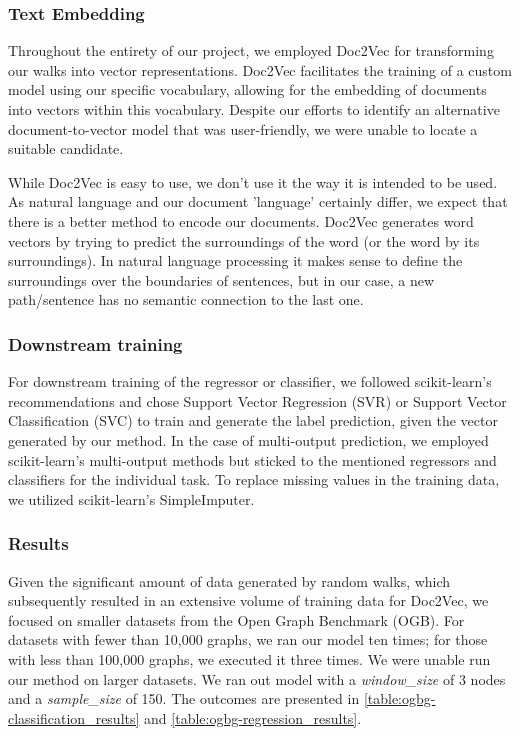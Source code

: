 \subsubsection{Text Embedding}
Throughout the entirety of our project, we employed Doc2Vec\cite{2014doc2vec} for transforming our walks into vector representations. Doc2Vec facilitates the training of a custom model using our specific vocabulary, allowing for the embedding of documents into vectors within this vocabulary. Despite our efforts to identify an alternative document-to-vector model that was user-friendly, we were unable to locate a suitable candidate.

While Doc2Vec is easy to use, we don't use it the way it is intended to be used. As natural language and our document 'language' certainly differ, we expect that there is a better method to encode our documents. Doc2Vec generates word vectors by trying to predict the surroundings of the word (or the word by its surroundings). In natural language processing it makes sense to define the surroundings over the boundaries of sentences, but in our case, a new path/sentence has no semantic connection to the last one.

\subsubsection{Downstream training}
For downstream training of the regressor or classifier, we followed scikit-learn's recommendations and chose Support Vector Regression (SVR) or Support Vector Classification (SVC) to train and generate the label prediction, given the vector generated by our method. In the case of multi-output prediction, we employed scikit-learn's multi-output methods but sticked to the mentioned regressors and classifiers for the individual task. To replace missing values in the training data, we utilized scikit-learn's SimpleImputer.

\subsubsection{Results}
Given the significant amount of data generated by random walks, which subsequently resulted in an extensive volume of training data for Doc2Vec, we focused on smaller datasets from the Open Graph Benchmark (OGB). For datasets with fewer than 10,000 graphs, we ran our model ten times; for those with less than 100,000 graphs, we executed it three times. We were unable run our method on larger datasets. We ran out model with a \emph{window\_size} of 3 nodes and a \emph{sample\_size} of 150. The outcomes are presented in \autoref{table:ogbg-classification_results} and \autoref{table:ogbg-regression_results}.

